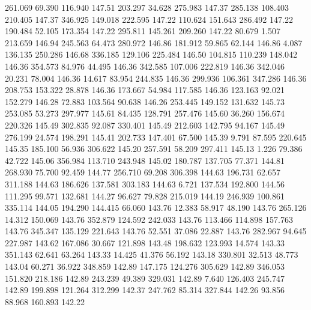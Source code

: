  261.069   69.390  116.940       147.51
 203.297   34.628  275.983       147.37
 285.138  108.403  210.405       147.37
 346.925  149.018  222.595       147.22
 110.624  151.643  286.492       147.22
 190.484   52.105  173.354       147.22
 295.811  145.261  209.260       147.22
  80.679    1.507  213.659       146.94
 245.563   64.473  280.972       146.86
 181.912   59.865   62.144       146.86
   4.087  136.135  250.286       146.68
 336.185  129.106  225.484       146.50
 104.815  110.239  148.042       146.36
 354.573   84.976   44.495       146.36
 342.585  107.006  222.819       146.36
 342.046   20.231   78.004       146.36
  14.617   83.954  244.835       146.36
 299.936  106.361  347.286       146.36
 208.753  153.322   28.878       146.36
 173.667   54.984  117.585       146.36
 123.163   92.021  152.279       146.28
  72.883  103.564   90.638       146.26
 253.445  149.152  131.632       145.73
 253.085   53.273  297.977       145.61
  84.435  128.791  257.476       145.60
  36.260  156.674  220.326       145.49
 302.835   92.087  330.401       145.49
 212.603  142.795   94.167       145.49
 276.199   24.574  198.291       145.41
 202.733  147.401   67.500       145.39
   9.791   87.595  220.645       145.35
 185.100   56.936  306.622       145.20
 257.591   58.209  297.411       145.13
   1.226   79.386   42.722       145.06
 356.984  113.710  243.948       145.02
 180.787  137.705   77.371       144.81
 268.930   75.700   92.459       144.77
 256.710   69.208  306.398       144.63
 196.731   62.657  311.188       144.63
 186.626  137.581  303.183       144.63
   6.721  137.534  192.800       144.56
 111.295   99.571  132.681       144.27
  96.627   79.828  215.019       144.19
 246.939  100.861  335.114       144.05
 194.290  144.415   66.060       143.76
  12.383   58.917   48.190       143.76
 265.126   14.312  150.069       143.76
 352.879  124.592  242.033       143.76
 113.466  114.898  157.763       143.76
 345.347  135.129  221.643       143.76
  52.551   37.086   22.887       143.76
 282.967   94.645  227.987       143.62
 167.086   30.667  121.898       143.48
 198.632  123.993   14.574       143.33
 351.143   62.641   63.264       143.33
  14.425   41.376   56.192       143.18
 330.801   32.513   48.773       143.04
  60.271   36.922  348.859       142.89
 147.175  124.276  305.629       142.89
 346.053  151.820  218.186       142.89
 243.239   49.389  329.031       142.89
   7.640  126.403  245.747       142.89
 199.898  121.264  312.299       142.37
 247.762   85.314  327.844       142.26
  93.856   88.968  160.893       142.22
